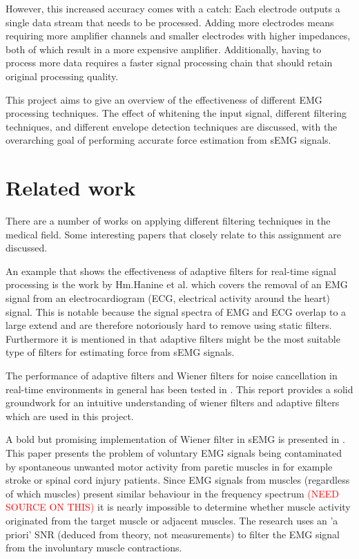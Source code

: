 However, this increased accuracy comes with a catch: Each electrode outputs a single data stream that needs to be processed. Adding more electrodes means requiring more amplifier channels and smaller electrodes with higher impedances, both of which result in a more expensive amplifier. Additionally, having to process more data requires a faster signal processing chain that should retain original processing quality.


This project aims to give an overview of the effectiveness of different EMG processing techniques. The effect of whitening the input signal, different filtering techniques, and different envelope detection techniques are discussed, with the overarching goal of performing accurate force estimation from sEMG signals.

\section{Related work}
There are a number of works on applying different filtering techniques in the medical field. Some interesting papers that closely relate to this assignment are discussed.

An example that shows the effectiveness of adaptive filters for real-time signal processing is the work by Hm.Hanine et al. \cite{adaptive_filter_emg_noise_cancellation_ecg} which covers the removal of an EMG signal from an electrocardiogram (ECG, electrical activity around the heart) signal. This is notable because the signal spectra of EMG and ECG overlap to a large extend and are therefore notoriously hard to remove using static filters. Furthermore it is mentioned in \cite{influence_semg_amplitude_estimation_technique_on_emg_force_relationship} that adaptive filters might be the most suitable type of filters for estimating force from sEMG signals.

The performance of adaptive filters and Wiener filters for noise cancellation in real-time environments in general has been tested in \cite{wiener_vs_adaptive_realtime_noisecancellation}. This report provides a solid groundwork for an intuitive understanding of wiener filters and adaptive filters which are used in this project.

A bold but promising implementation of Wiener filter in sEMG is presented in \cite{wiener_filter_a_priori_semg}. This paper presents the problem of voluntary EMG signals being contaminated by spontaneous unwanted motor activity from paretic muscles in for example stroke or spinal cord injury patients. Since EMG signals from muscles (regardless of which muscles) present similar behaviour in the frequency spectrum \textcolor{red}{(NEED SOURCE ON THIS)} it is nearly impossible to determine whether muscle activity originated from the target muscle or adjacent muscles. The research uses an 'a priori' SNR (deduced from theory, not measurements) to filter the EMG signal from the involuntary muscle contractions. 


